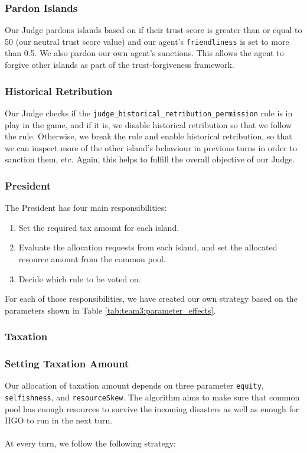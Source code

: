 \subsubsection*{Pardon Islands}

Our Judge pardons islands based on if their trust score is greater than or equal to 50 (our neutral trust score value) and our agent's \texttt{friendliness} is set to more than 0.5. We also pardon our own agent's sanctions. This allows the agent to forgive other islands as part of the trust-forgiveness framework.

\subsubsection*{Historical Retribution}

Our Judge checks if the \texttt{judge\_historical\_retribution\_permission} rule is in play in the game, and if it is, we disable historical retribution so that we follow the rule. Otherwise, we break the rule and enable historical retribution, so that we can inspect more of the other island's behaviour in previous turns in order to sanction them, etc. Again, this helps to fulfill the overall objective of our Judge.

\subsubsection{President}
The President has four main responsibilities:

\begin{enumerate}
    \item Set the required tax amount for each island.
    \item Evaluate the allocation requests from each island, and set the allocated resource amount from the common pool.
    \item Decide which rule to be voted on.
\end{enumerate}

For each of those responsibilities, we have created our own strategy based on the parameters shown in Table \ref{tab:team3:parameter_effects}.

\subsubsection*{Taxation}
\subsubsection*{Setting Taxation Amount}
Our allocation of taxation amount depends on three parameter \texttt{equity}, \texttt{selfishness}, and \texttt{resourceSkew}. The algorithm aims to make sure that common pool has enough resources to survive the incoming disasters as well as enough for IIGO to run in the next turn.\\\\
At every turn, we follow the following strategy:

